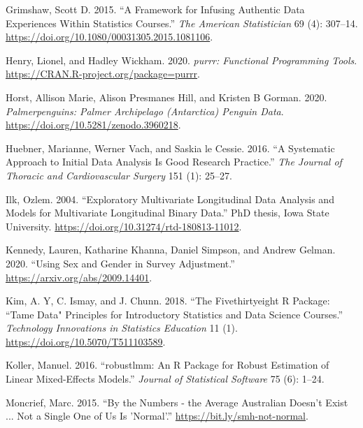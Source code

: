 \documentclass{article}
\newlength{\cslhangindent}
\newlength{\cslentryspacingunit} %
\newenvironment{CSLReferences}[2] %
 {%
  \setlength{\parindent}{0pt}
  \ifodd #1
  \let\oldpar\par
  \def\par{\hangindent=\cslhangindent\oldpar}
  \fi
  \setlength{\parskip}{#2\cslentryspacingunit}
 }%
 {}
\begin{document}
\begin{CSLReferences}{1}{0}
\leavevmode{}%
Grimshaw, Scott D. 2015. {``A Framework for Infusing Authentic Data Experiences Within Statistics Courses.''} \emph{The American Statistician} 69 (4): 307--14. \url{https://doi.org/10.1080/00031305.2015.1081106}.

\leavevmode{}%
Henry, Lionel, and Hadley Wickham. 2020. \emph{{purrr: Functional Programming Tools}}. \url{https://CRAN.R-project.org/package=purrr}.

\leavevmode{}%
Horst, Allison Marie, Alison Presmanes Hill, and Kristen B Gorman. 2020. \emph{Palmerpenguins: Palmer Archipelago (Antarctica) Penguin Data}. \url{https://doi.org/10.5281/zenodo.3960218}.

\leavevmode{}%
Huebner, Marianne, Werner Vach, and Saskia le Cessie. 2016. {``A Systematic Approach to Initial Data Analysis Is Good Research Practice.''} \emph{The Journal of Thoracic and Cardiovascular Surgery} 151 (1): 25--27.

\leavevmode{}%
Ilk, Ozlem. 2004. {``Exploratory Multivariate Longitudinal Data Analysis and Models for Multivariate Longitudinal Binary Data.''} PhD thesis, Iowa State University. \url{https://doi.org/10.31274/rtd-180813-11012}.

\leavevmode{}%
Kennedy, Lauren, Katharine Khanna, Daniel Simpson, and Andrew Gelman. 2020. {``Using Sex and Gender in Survey Adjustment.''} \url{https://arxiv.org/abs/2009.14401}.

\leavevmode{}%
Kim, A. Y, C. Ismay, and J. Chunn. 2018. {``The Fivethirtyeight {R} Package: ``Tame Data" Principles for Introductory Statistics and Data Science Courses.''} \emph{Technology Innovations in Statistics Education} 11 (1). \url{https://doi.org/10.5070/T511103589}.

\leavevmode{}%
Koller, Manuel. 2016. {``{robustlmm: An R Package for Robust Estimation of Linear Mixed-Effects Models}.''} \emph{Journal of Statistical Software} 75 (6): 1--24.

\leavevmode{}%
Moncrief, Marc. 2015. {``By the Numbers - the Average Australian Doesn't Exist ... Not a Single One of Us Is 'Normal'.''} \url{https://bit.ly/smh-not-normal}.


\end{CSLReferences}
\end{document}
